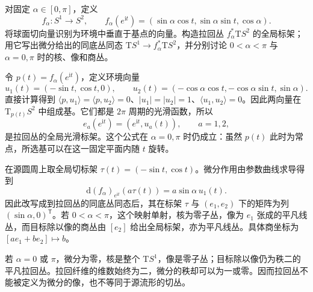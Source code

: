 \begin{exercise}\label{g1:ex:latitude-pullback-bundle}
	对固定 \(\alpha\in[0,\pi]\)，定义
	\[
		f_\alpha:S^1\longrightarrow S^2,\qquad
		f_\alpha(e^{\mathrm{i}t})=(\sin\alpha\cos t,\sin\alpha\sin t,\cos\alpha).
	\]
	将球面切向量识别为环境中垂直于基点的向量。构造拉回丛 \(f_\alpha^*\mathrm{T}S^2\) 的全局标架；用它写出微分给出的同底丛同态 \(\mathrm{T}S^1\to f_\alpha^*\mathrm{T}S^2\)，并分别讨论 \(0<\alpha<\pi\) 与 \(\alpha=0,\pi\) 时的核、像和商丛。
\end{exercise}
\begin{solution}
	令 \(p(t)=f_\alpha(e^{\mathrm{i}t})\)，定义环境向量
	\[
		u_1(t)=(-\sin t,\cos t,0),\qquad
		u_2(t)=(-\cos\alpha\cos t,-\cos\alpha\sin t,\sin\alpha).
	\]
	直接计算得到 \(\langle p,u_1\rangle=\langle p,u_2\rangle=0\)、\(|u_1|=|u_2|=1\)、\(\langle u_1,u_2\rangle=0\)。因此两向量在 \(\mathrm{T}_{p(t)}S^2\) 中组成基。它们都是 \(2\pi\) 周期的光滑函数，所以
	\[
		e_a(e^{\mathrm{i}t})=(e^{\mathrm{i}t},u_a(t)),\qquad a=1,2,
	\]
	是拉回丛的全局光滑标架。这个公式在 \(\alpha=0,\pi\) 时仍成立：虽然 \(p(t)\) 此时为常点，所选基可以在这一固定平面内随 \(t\) 旋转。

	在源圆周上取全局切标架 \(\tau(t)=(-\sin t,\cos t)\)。微分作用由参数曲线求导得到
	\[
		\mathrm{d}(f_\alpha)_{e^{\mathrm{i}t}}(a\tau(t))
		=a\sin\alpha\,u_1(t).
	\]
	因此改写成到拉回丛的同底丛同态后，其在标架 \(\tau\) 与 \((e_1,e_2)\) 下的矩阵为列 \((\sin\alpha,0)^{\mathsf T}\)。若 \(0<\alpha<\pi\)，这个映射单射，核为零子丛，像为 \(e_1\) 张成的平凡线丛，而目标除以像的商丛由 \([e_2]\) 给出全局标架，亦为平凡线丛。具体商坐标为 \([a e_1+b e_2]\mapsto b\)。

	若 \(\alpha=0\) 或 \(\pi\)，微分为零，核是整个 \(\mathrm{T}S^1\)，像是零子丛；目标除以像仍为秩二的平凡拉回丛。拉回纤维的维数始终为二，微分的秩却可以为一或零。因而拉回丛不能被定义为微分的像，也不等同于源流形的切丛。
\end{solution}

